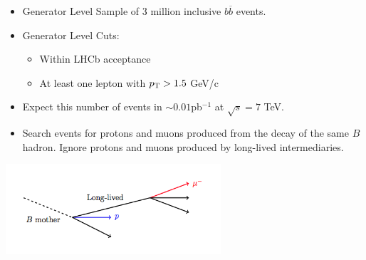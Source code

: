 \documentclass{beamer}
\begin{document}
{{\begin{itemize}
 \setlength{\itemsep}{5pt}
\item Generator Level Sample of 3 million inclusive $b\overline{b}$ events.
\item Generator Level Cuts: 
\begin{itemize}
\item Within LHCb acceptance
\item At least one lepton with $p_{\rm{T}}> 1.5$ GeV/c
\end{itemize}
\item Expect this number of events in $\sim$$0.01$pb$^{-1}$ at $\sqrt{s} = 7$ TeV.
\item Search events for protons and muons produced from the decay of the same $B$ hadron.  Ignore protons and muons produced by long-lived intermediaries.
\end{itemize}
    \begin{center}
      \includegraphics[width=0.6\textwidth]{GL1.png} 
   
  \end{center}

}



}
\end{document}
